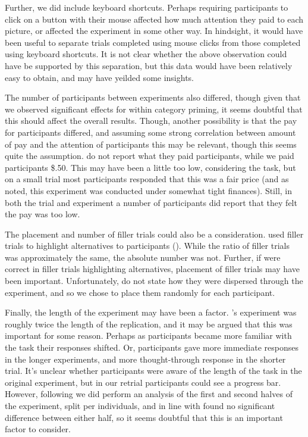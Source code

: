 \documentclass[10pt]{article}
\begin{document}
\begin{multicols}{2}
Further, we did include keyboard shortcuts.
Perhaps requiring participants to click on a button with their mouse affected how much attention they paid to each picture, or affected the experiment in some other way.
In hindsight, it would have been useful to separate trials completed using mouse clicks from those completed using keyboard shortcuts.
It is not clear whether the above observation could have be supported by this separation, but this data would have been relatively easy to obtain, and may have yeilded some insights.

The number of participants between experiments also differed, though given that we observed significant effects for within category priming, it seems doubtful that this should affect the overall results.
Though, another possibility is that the pay for participants differed, and assuming some strong correlation between amount of pay and the attention of participants this may be relevant, though this seems quite the assumption.
\citeauthor{Bott:2016aa} do not report what they paid participants, while we paid participants \$.50.
This may have been a little too low, considering the task, but on a small trial most participants responded that this was a fair price (and as noted, this experiment was conducted under somewhat tight finances).
Still, in both the trial and experiment a number of participants did report that they felt the pay was too low.

The placement and number of filler trials could also be a consideration.
\citeauthor{Bott:2016aa} used filler trials to highlight alternatives to participants (\citeyear[123]{Bott:2016aa}).
While the ratio of filler trials was approximately the same, the absolute number was not.
Further, if \citeauthor{Bott:2016aa} were correct in filler trials highlighting alternatives, placement of filler trials may have been important.
Unfortunately, \citeauthor{Bott:2016aa} do not state how they were dispersed through the experiment, and so we chose to place them randomly for each participant.

Finally, the length of the experiment may have been a factor.
\citeauthor{Bott:2016aa}'s experiment was roughly twice the length of the replication, and it may be argued that this was important for some reason.
Perhaps as participants became more familiar with the task their responses shifted.
Or, participants gave more immediate responses in the longer experiments, and more thought-through response in the shorter trial.
It's unclear whether participants were aware of the length of the task in the original experiment, but in our retrial participants could see a progress bar.
However, following \citeauthor{Bott:2016aa} we did perform an analysis of the first and second halves of the experiment, split per individuals, and in line with \citeauthor{Bott:2016aa} found no significant difference between either half, so it seems doubtful that this is an important factor to consider.


\end{multicols}
\end{document}
